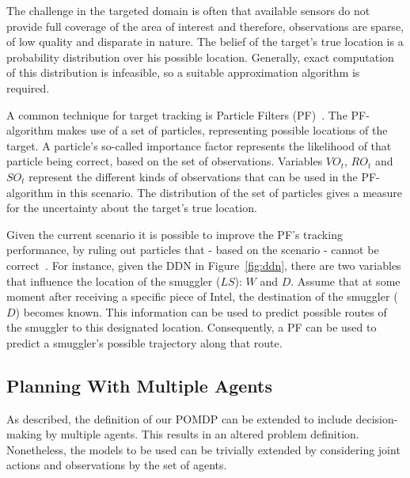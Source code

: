 \documentclass[conference]{IEEEtran}
\begin{document}
The challenge in the targeted domain is often that available sensors do not provide full coverage of the area of interest and therefore, observations are sparse, of low quality and disparate in nature. The belief of the target's true location is a probability distribution over his possible location. Generally, exact computation of this distribution is infeasible, so a suitable approximation algorithm is required.

A common technique for target tracking is Particle Filters (PF)~\cite{Blackman1999}. The PF-algorithm makes use of a set of particles, representing possible locations of the target. A particle's so-called importance factor represents the likelihood of that particle being correct, based on the set of observations. Variables $VO_t$, $RO_t$ and $SO_t$ represent the different kinds of observations that can be used in the PF-algorithm in this scenario. The distribution of the set of particles gives a measure for the uncertainty about the target's true location.

Given the current scenario it is possible to improve the PF's tracking performance, by ruling out particles that - based on the scenario - cannot be correct~\cite{Claessens2015}. For instance, given the DDN in Figure~\ref{fig:ddn}, there are two variables that influence the location of the smuggler ($LS$): $W$ and $D$. Assume that at some moment after receiving a specific piece of Intel, the destination of the smuggler ($D$) becomes known. This information can be used to predict possible routes of the smuggler to this designated location. Consequently, a PF can be used to predict a smuggler's possible trajectory along that route.

\subsection{Planning With Multiple Agents}
\label{sub:plan-mult-ag}

As described, the definition of our POMDP can be extended to include decision-making by multiple agents. This results in an altered problem definition. Nonetheless, the models to be used can be trivially extended by considering joint actions and observations by the set of agents.
\end{document}
